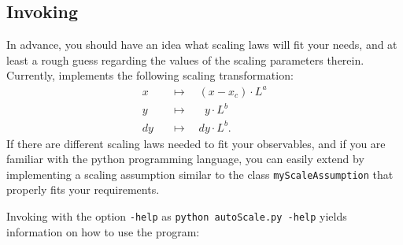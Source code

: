 \subsection{Invoking \myProg{}} 
\label{ASAsect02subsect02}
In advance, you should have an idea what scaling laws will fit your needs, 
and at least a rough guess regarding the values of the scaling parameters therein. 
Currently, \myProg{} implements the following scaling transformation:  
\begin{eqnarray*}
x  &&\mapsto \quad (x-x_c) \cdot L^a \\
y  &&\mapsto \quad \phantom{d}y\cdot L^b \\
dy &&\mapsto \quad dy\cdot L^b. 
\end{eqnarray*}
If there are different scaling laws needed to fit your observables, 
and if you are familiar with the python programming language, you can easily 
extend \myProg{} by implementing a scaling assumption similar to the class 
\verb'myScaleAssumption' that properly fits your requirements.

Invoking \myProg{} with the option \verb'-help' as \verb|python autoScale.py -help| yields information on how to use the program:

